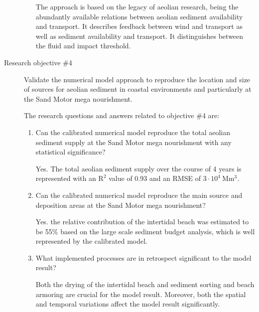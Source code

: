 \begin{description}
\begin{enumerate}[{3.}1]
    The approach is based on the legacy of aeolian research, being the
    abundantly available relations between aeolian sediment
    availability and transport. It describes feedback between wind and
    transport as well as sediment availability and
    transport. It distinguishes between the fluid and impact
    threshold.

\end{enumerate}

\bigskip

\item[Research objective \#4] Validate the numerical model approach to
  reproduce the location and size of sources for aeolian sediment in
  coastal environments and particularly at the Sand Motor mega
  nourishment.

  \medskip

  The research questions and answers related to objective \#4 are:

  \begin{enumerate}[{4.}1]
  \item Can the calibrated numerical model reproduce the total aeolian
    sediment supply at the Sand Motor mega nourishment with any
    statistical significance?

    Yes. The total aeolian sediment supply over the course of 4 years
    is represented with an $\mathrm{R^2}$ value of 0.93 and an RMSE of
    $3 \cdot 10^4 ~ \mathrm{Mm^3}$.

  \item Can the calibrated numerical model reproduce the main source
    and deposition areas at the Sand Motor mega nourishment?

    Yes. the relative contribution of the intertidal beach was
    estimated to be 55\% based on the large scale sediment budget
    analysis, which is well represented by the calibrated
    model.%


  \item What implemented processes are in retrospect significant to
    the model result?

    Both the drying of the intertidal beach and sediment sorting and
    beach armoring are crucial for the model result. Moreover, both
    the spatial and temporal variations affect the model result
    significantly.

\end{enumerate}
\end{description}

